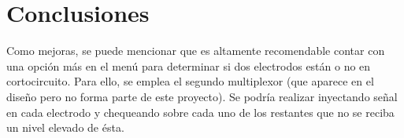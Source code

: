 \section{Conclusiones}
Como mejoras, se puede mencionar que es altamente recomendable contar con una opción más en el menú para determinar si dos electrodos están o no en cortocircuito. Para ello, se emplea el segundo multiplexor (que aparece en el diseño pero no forma parte de este proyecto). Se podría realizar inyectando señal en cada electrodo y chequeando sobre cada uno de los restantes que no se reciba un nivel elevado de ésta.

